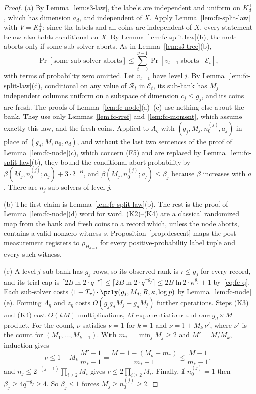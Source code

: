 \begin{proof}
(a) By Lemma~\ref{lem:s3-law}, the labels are independent and uniform on $K_d^\perp$, which has dimension $a_d$, and independent of $X$. Apply Lemma~\ref{lem:fc-split-law} with $V = K_d^\perp$; since the labels and all coins are independent of $X$, every statement below also holds conditional on $X$. By Lemma~\ref{lem:fc-split-law}(b), the node aborts only if some sub-solver aborts. As in Lemma~\ref{lem:s3-tree}(b),
\[
  \Pr[\text{some sub-solver aborts}] \le \sum_{t=0}^{\nu-1}\Pr[v_{t+1}\ \text{aborts}\mid\mathcal{E}_t],
\]
with terms of probability zero omitted. Let $v_{t+1}$ have level $j$. By Lemma~\ref{lem:fc-split-law}(d), conditional on any value of $\mathcal{R}_t$ in $\mathcal{E}_t$, its sub-bank has $M_j$ independent columns uniform on a subspace of dimension $a_j \le g_j$, and its coins are fresh. The proofs of Lemma~\ref{lem:fc-node}(a)--(c) use nothing else about the bank. They use only Lemmas~\ref{lem:fc-rref} and~\ref{lem:fc-moment}, which assume exactly this law, and the fresh coins. Applied to $\Lambda_\eta$ with $(g_j, M_j, n_0^{(j)}, a_j)$ in place of $(g_d, M, n_0, a_d)$, and without the last two sentences of the proof of Lemma~\ref{lem:fc-node}(c), which concern (F5) and are replaced by Lemma~\ref{lem:fc-split-law}(b), they bound the conditional abort probability by $\beta(M_j, n_0^{(j)}; a_j) + 3\cdot 2^{-B}$, and $\beta(M_j, n_0^{(j)}; a_j) \le \beta_j$ because $\beta$ increases with $a$. There are $n_j$ sub-solvers of level $j$.

(b) The first claim is Lemma~\ref{lem:fc-split-law}(b). The rest is the proof of Lemma~\ref{lem:fc-node}(d) word for word. (K2)--(K4) are a classical randomized map from the bank and fresh coins to a record which, unless the node aborts, contains a valid nonzero witness $s$. Proposition~\ref{prop:descent} maps the post-measurement registers to $\rho_{H_{d-1}}$ for every positive-probability label tuple and every such witness.

(c) A level-$j$ sub-bank has $g_j$ rows, so its observed rank is $r \le g_j$ for every record, and its trial cap is $\lceil 2B\ln 2\cdot q^{-r}\rceil \le \lceil 2B\ln 2\cdot q^{-g_j}\rceil \le 2B\ln 2\cdot\kappa^{g_j} + 1$ by~\eqref{eq:fc-q}. Each sub-solver costs $(1 + T_r)\cdot\poly(g_j, M_j, B, \kappa, \log p)$ by Lemma~\ref{lem:fc-node}(e). Forming $\Lambda_\eta$ and $z_\eta$ costs $O(g_jg_dM_j + g_dM_j)$ further operations. Steps (K3) and (K4) cost $O(kM)$ multiplications, $M$ exponentiations and one $g_d\times M$ product. For the count, $\nu$ satisfies $\nu = 1$ for $k = 1$ and $\nu = 1 + M_k\,\nu'$, where $\nu'$ is the count for $(M_1,\dots,M_{k-1})$. With $m_* = \min_jM_j \ge 2$ and $M' = M/M_k$, induction gives
\[
  \nu \le 1 + M_k\,\frac{M'-1}{m_*-1} = \frac{M - 1 - (M_k - m_*)}{m_*-1} \le \frac{M-1}{m_*-1},
\]
and $n_j \le 2^{-(j-1)}\prod_{i\ge2}M_i$ gives $\nu \le 2\prod_{i\ge2}M_i$. Finally, if $n_0^{(j)} = 1$ then $\beta_j \ge 4q^{-g_j} \ge 4$. So $\beta_j \le 1$ forces $M_j \ge n_0^{(j)} \ge 2$.
\end{proof}

